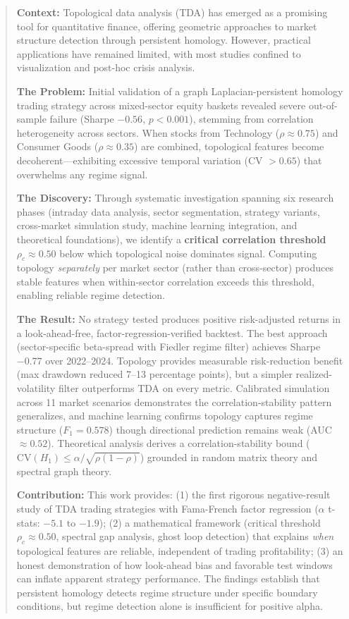 \documentclass[12pt,letterpaper]{article}
\begin{document}
\begin{abstract}
\noindent \textbf{Context:} Topological data analysis (TDA) has emerged as a promising tool for quantitative finance, offering geometric approaches to market structure detection through persistent homology. However, practical applications have remained limited, with most studies confined to visualization and post-hoc crisis analysis.

\textbf{The Problem:} Initial validation of a graph Laplacian-persistent homology trading strategy across mixed-sector equity baskets revealed severe out-of-sample failure (Sharpe $-0.56$, $p < 0.001$), stemming from correlation heterogeneity across sectors. When stocks from Technology ($\rho \approx 0.75$) and Consumer Goods ($\rho \approx 0.35$) are combined, topological features become decoherent---exhibiting excessive temporal variation (CV $> 0.65$) that overwhelms any regime signal.

\textbf{The Discovery:} Through systematic investigation spanning six research phases (intraday data analysis, sector segmentation, strategy variants, cross-market simulation study, machine learning integration, and theoretical foundations), we identify a \textbf{critical correlation threshold} $\rho_c \approx 0.50$ below which topological noise dominates signal. Computing topology \textit{separately} per market sector (rather than cross-sector) produces stable features when within-sector correlation exceeds this threshold, enabling reliable regime detection.

\textbf{The Result:} No strategy tested produces positive risk-adjusted returns in a look-ahead-free, factor-regression-verified backtest. The best approach (sector-specific beta-spread with Fiedler regime filter) achieves Sharpe $-0.77$ over 2022--2024. Topology provides measurable risk-reduction benefit (max drawdown reduced 7--13 percentage points), but a simpler realized-volatility filter outperforms TDA on every metric. Calibrated simulation across 11 market scenarios demonstrates the correlation-stability pattern generalizes, and machine learning confirms topology captures regime structure ($F_1 = 0.578$) though directional prediction remains weak (AUC $\approx 0.52$). Theoretical analysis derives a correlation-stability bound ($\text{CV}(H_1) \leq \alpha/\sqrt{\rho(1-\rho)}$) grounded in random matrix theory and spectral graph theory.

\textbf{Contribution:} This work provides: (1) the first rigorous negative-result study of TDA trading strategies with Fama-French factor regression ($\alpha$ t-stats: $-5.1$ to $-1.9$); (2) a mathematical framework (critical threshold $\rho_c \approx 0.50$, spectral gap analysis, ghost loop detection) that explains \textit{when} topological features are reliable, independent of trading profitability; (3) an honest demonstration of how look-ahead bias and favorable test windows can inflate apparent strategy performance. The findings establish that persistent homology detects regime structure under specific boundary conditions, but regime detection alone is insufficient for positive alpha.


\end{abstract}
\end{document}
